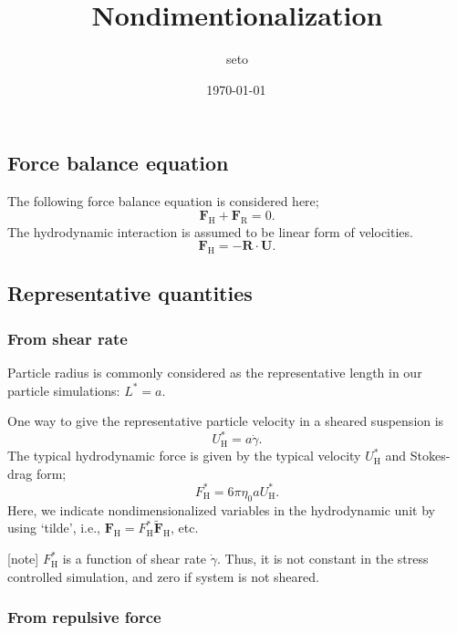 \documentclass[fontsize=11pt]{scrartcl}
\title{Nondimentionalization}
\date{\shortdate\today \, \ampmtime }
\author{seto}
\begin{document}
\maketitle

\subsection*{Force balance equation}

The following force balance equation is considered here;
\begin{equation}
 \bm{F}_{\mathrm{H}} +  \bm{F}_{\mathrm{R}}  = 0.
\end{equation}
%
The hydrodynamic interaction is
assumed to be linear form of velocities.
%
\begin{equation}
 \bm{F}_{\mathrm{H}} = - \bm{R}\cdot\bm{U}.
\end{equation}

\subsection*{Representative quantities}

\subsubsection*{From shear rate}
Particle radius is commonly considered
as the representative length in
our particle simulations: $L^{\ast} = a$.

One way to give the representative particle velocity
in a sheared suspension is
\begin{equation}
U_{\mathrm{H}}^{\ast} = a \dot{\gamma}.
\end{equation}
%
%
The typical hydrodynamic force is given
by the typical velocity $U_{\mathrm{H}}^{\ast} $
and Stokes-drag form;
\begin{equation}
  F_{\mathrm{H}}^{\ast} = 6 \pi \eta_0 a U_{\mathrm{H}}^{\ast}.
\end{equation}
Here, we indicate nondimensionalized variables
in the hydrodynamic unit by using `tilde',
i.e.,
$\bm{F}_{\mathrm{H}} = F_{\mathrm{H}}^{\ast} \tilde{\bm{F}}_{\mathrm{H}} $,
etc.
%

[note]
$F_{\mathrm{H}}^{\ast}$ is a function of shear rate $\dot{\gamma}$.
%
Thus,
it is not constant in the stress controlled simulation,
and zero if system is not sheared.




\subsubsection*{From repulsive force}
\end{document}
